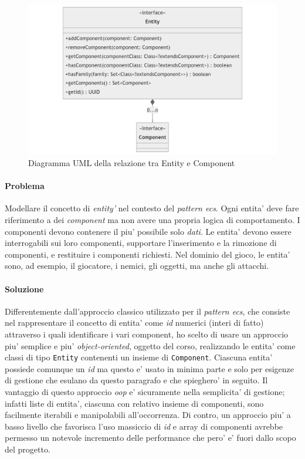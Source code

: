 \documentclass[a4paper,12pt]{report}
\begin{document}
\begin{figure}[h]
	\centering
	\includegraphics[width=\textwidth]{uml/uml_entity_component.png}
	\caption{Diagramma UML della relazione tra Entity e Component}
	\label{img:badarch}
\end{figure}

\paragraph{Problema}
Modellare il concetto di \textit{entity'} nel contesto del \textit{pattern ecs}. Ogni entita' deve fare riferimento a dei \textit{component} ma non avere una propria logica di comportamento. I componenti devono contenere il piu' possibile solo \textit{dati}. Le entita' devono essere interrogabili sui loro componenti, supportare l'inserimento e la rimozione di componenti, e restituire i componenti richiesti. Nel dominio del gioco, le entita' sono, ad esempio, il giocatore, i nemici, gli oggetti, ma anche gli attacchi.

\paragraph*{Soluzione}
Differentemente dall'approccio classico utilizzato per il \textit{pattern ecs}, che consiste nel rappresentare il concetto di entita' come \textit{id} numerici (interi di fatto) attraverso i quali identificare i vari component, ho scelto di usare un approccio piu' semplice e piu' \textit{object-oriented}, oggetto del corso, realizzando le entita' come classi di tipo \texttt{Entity} contenenti un insieme di \texttt{Component}. Ciascuna entita' possiede comunque un \textit{id} ma questo e' usato in minima parte e solo per esigenze di gestione che esulano da questo paragrafo e che spieghero' in seguito. 
Il vantaggio di questo approccio \textit{oop} e' sicuramente nella semplicita' di gestione; infatti liste di entita', ciascuna con relativo insieme di componenti, sono facilmente iterabili e manipolabili all'occorrenza. Di contro, un approccio piu' a basso livello che favorisca l'uso massiccio di \textit{id} e array di componenti avrebbe permesso un notevole incremento delle performance che pero' e' fuori dallo scopo del progetto.
\end{document}

